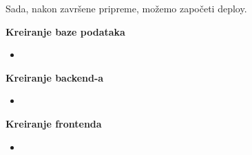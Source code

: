 			Sada, nakon završene pripreme, možemo započeti deploy.
			
				\begin{packed_enum}
				\item \textbf{Kreiranje baze podataka}
				\begin{itemize}
					\item
				\end{itemize}
				
				\item \textbf{Kreiranje backend-a}
				\begin{itemize}
					\item 
				\end{itemize}
				
				\item \textbf{Kreiranje frontenda}
				\begin{itemize}
					\item 
				\end{itemize}
			\end{packed_enum}
		
				
			
			
			
